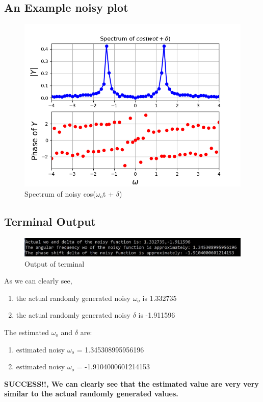 \documentclass[11pt]{article}
\begin{document}
\subsection{An Example noisy plot}
\begin{figure}[H]
    \centering
    \includegraphics[scale = 0.75]{Figure_9.png}
    \caption{Spectrum of noisy cos($\omega _o$t + $\delta$)}
\end{figure}

\subsection{Terminal Output}
\begin{figure}[H]
    \centering
    \includegraphics[scale = 0.75]{Output_2.jpg}
    \caption{Output of terminal}
\end{figure}
As we can clearly see, 
\begin{enumerate}
    \item the actual randomly generated noisy $\omega _o$ is 1.332735
    \item the actual randomly generated noisy $\delta$ is -1.911596
\end{enumerate}
The estimated $\omega _o$ and $\delta$ are:
\begin{enumerate}
    \item estimated noisy $\omega _o$ = 1.345308995956196
    \item estimated noisy $\omega _o$ = -1.9104000601214153
\end{enumerate}
\textbf{SUCCESS!!, We can clearly see that the estimated value are very very similar to the actual randomly generated values.}
\end{document}
